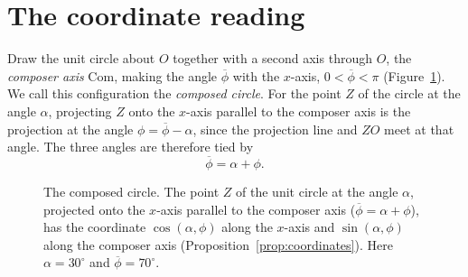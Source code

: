 \documentclass[11pt]{amsart}
\theoremstyle{definition}
\theoremstyle{remark}
\numberwithin{equation}{section}
\newcommand{\Com}{\mathrm{Com}}
\newcommand{\pb}{\overline{\phi}}
\begin{document}
\section{The coordinate reading}
\label{sec:coordinates}

Draw the unit circle about $O$ together with a second axis through $O$,
the \emph{composer axis} $\Com$, making the angle $\pb$ with the
$x$-axis, $0 < \pb < \pi$ (Figure~\ref{fig:composed}). We call this
configuration the \emph{composed circle}. For the point $Z$ of the circle
at the angle $\alpha$, projecting $Z$ onto the $x$-axis parallel to the
composer axis is the projection at the angle $\phi = \pb - \alpha$, since
the projection line and $ZO$ meet at that angle. The three angles are
therefore tied by
\begin{equation}
\label{eq:phibar}
\pb = \alpha + \phi .
\end{equation}

\begin{figure}[t]
\centering
{}
\caption{The composed circle. The point $Z$ of the unit circle at the
angle $\alpha$, projected onto the $x$-axis parallel to the composer axis
($\pb = \alpha+\phi$), has the coordinate $\cos(\alpha,\phi)$ along the
$x$-axis and $\sin(\alpha,\phi)$ along the composer axis
(Proposition~\ref{prop:coordinates}). Here $\alpha = 30^\circ$ and
$\pb = 70^\circ$.}
\label{fig:composed}
\end{figure}
\end{document}
